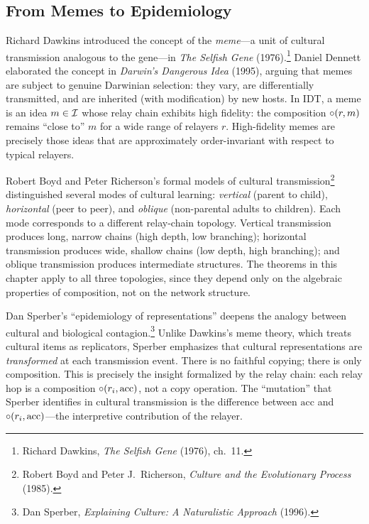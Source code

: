 \subsection{From Memes to Epidemiology}

Richard Dawkins introduced the concept of the \emph{meme}---a unit of
cultural transmission analogous to the gene---in \textit{The Selfish
Gene} (1976).\footnote{Richard Dawkins, \textit{The Selfish Gene} (1976),
ch.\ 11.}  Daniel Dennett elaborated the concept in \textit{Darwin's
Dangerous Idea} (1995), arguing that memes are subject to genuine
Darwinian selection: they vary, are differentially transmitted, and are
inherited (with modification) by new hosts.  In IDT, a meme is an idea
$m \in \mathcal{I}$ whose relay chain exhibits high fidelity: the composition
$\circ(r, m)$ remains ``close to'' $m$ for a wide range of relayers $r$.
High-fidelity memes are precisely those ideas that are approximately
order-invariant with respect to typical relayers.

Robert Boyd and Peter Richerson's formal models of cultural
transmission\footnote{Robert Boyd and Peter J.\ Richerson, \textit{Culture
and the Evolutionary Process} (1985).} distinguished several modes of
cultural learning: \emph{vertical} (parent to child), \emph{horizontal}
(peer to peer), and \emph{oblique} (non-parental adults to children).  Each
mode corresponds to a different relay-chain topology.  Vertical transmission
produces long, narrow chains (high depth, low branching); horizontal
transmission produces wide, shallow chains (low depth, high branching);
and oblique transmission produces intermediate structures.  The theorems
in this chapter apply to all three topologies, since they depend only on
the algebraic properties of composition, not on the network structure.

Dan Sperber's ``epidemiology of representations'' deepens the analogy
between cultural and biological contagion.\footnote{Dan Sperber,
\textit{Explaining Culture: A Naturalistic Approach} (1996).}  Unlike
Dawkins's meme theory, which treats cultural items as replicators, Sperber
emphasizes that cultural representations are \emph{transformed} at each
transmission event.  There is no faithful copying; there is only
composition.  This is precisely the insight formalized by the relay chain:
each relay hop is a composition $\circ(r_i, \text{acc})$, not a copy
operation.  The ``mutation'' that Sperber identifies in cultural
transmission is the difference between $\text{acc}$ and
$\circ(r_i, \text{acc})$---the interpretive contribution of the relayer.

